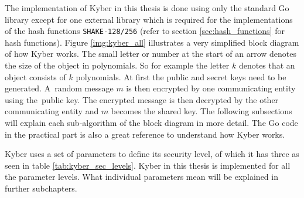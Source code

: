 The implementation of Kyber in this thesis is done using only the standard Go library except for one external library \cite{00fV2cvg7Z6H2tS3} which is required for the implementations of the hash functions \texttt{SHAKE-128/256} (refer to section \ref{sec:hash_functions} for hash functions). Figure \ref{img:kyber_all} illustrates a very simplified block diagram of how Kyber works. The small letter or number at the start of an arrow denotes the size of the object in polynomials. So for example the letter $k$ denotes that an object consists of $k$ polynomials. At first the public and secret keys need to be generated. A~random message $m$ is then encrypted by one communicating entity using the~public key. The encrypted message is then decrypted by the other communicating entity and $m$ becomes the shared key. The following subsections will explain each sub-algorithm of the block diagram in more detail. The Go code in the practical part is also a great reference to understand how Kyber works.


Kyber uses a set of parameters to define its security level, of which it has three as seen in table \ref{tab:kyber_sec_levels}. Kyber in this thesis is implemented for all the parameter levels. What individual parameters mean will be explained in further subchapters.
